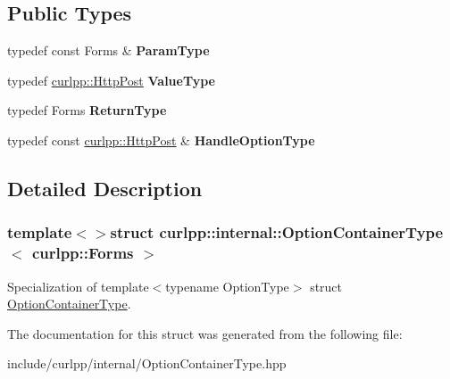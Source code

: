 \subsection*{Public Types}
\begin{DoxyCompactItemize}
\item 
\hypertarget{structcurlpp_1_1internal_1_1OptionContainerType_3_01curlpp_1_1Forms_01_4_a64badef84ab18e66590c3a1e7b8eae2c}{typedef const Forms \& {\bfseries Param\-Type}}\label{structcurlpp_1_1internal_1_1OptionContainerType_3_01curlpp_1_1Forms_01_4_a64badef84ab18e66590c3a1e7b8eae2c}

\item 
\hypertarget{structcurlpp_1_1internal_1_1OptionContainerType_3_01curlpp_1_1Forms_01_4_ac090aaf7bf7d56b8419dd3f722136537}{typedef \hyperlink{classcurlpp_1_1HttpPost}{curlpp\-::\-Http\-Post} {\bfseries Value\-Type}}\label{structcurlpp_1_1internal_1_1OptionContainerType_3_01curlpp_1_1Forms_01_4_ac090aaf7bf7d56b8419dd3f722136537}

\item 
\hypertarget{structcurlpp_1_1internal_1_1OptionContainerType_3_01curlpp_1_1Forms_01_4_a9206b135527b4204c70a0b773b8ca0c4}{typedef Forms {\bfseries Return\-Type}}\label{structcurlpp_1_1internal_1_1OptionContainerType_3_01curlpp_1_1Forms_01_4_a9206b135527b4204c70a0b773b8ca0c4}

\item 
\hypertarget{structcurlpp_1_1internal_1_1OptionContainerType_3_01curlpp_1_1Forms_01_4_ad520b1f4bc665c646417c65217fe5491}{typedef const \hyperlink{classcurlpp_1_1HttpPost}{curlpp\-::\-Http\-Post} \& {\bfseries Handle\-Option\-Type}}\label{structcurlpp_1_1internal_1_1OptionContainerType_3_01curlpp_1_1Forms_01_4_ad520b1f4bc665c646417c65217fe5491}

\end{DoxyCompactItemize}


\subsection{Detailed Description}
\subsubsection*{template$<$$>$struct curlpp\-::internal\-::\-Option\-Container\-Type$<$ curlpp\-::\-Forms $>$}

Specialization of template$<$typename Option\-Type$>$ struct \hyperlink{structcurlpp_1_1internal_1_1OptionContainerType}{Option\-Container\-Type}. 

The documentation for this struct was generated from the following file\-:\begin{DoxyCompactItemize}
\item 
include/curlpp/internal/Option\-Container\-Type.\-hpp\end{DoxyCompactItemize}
